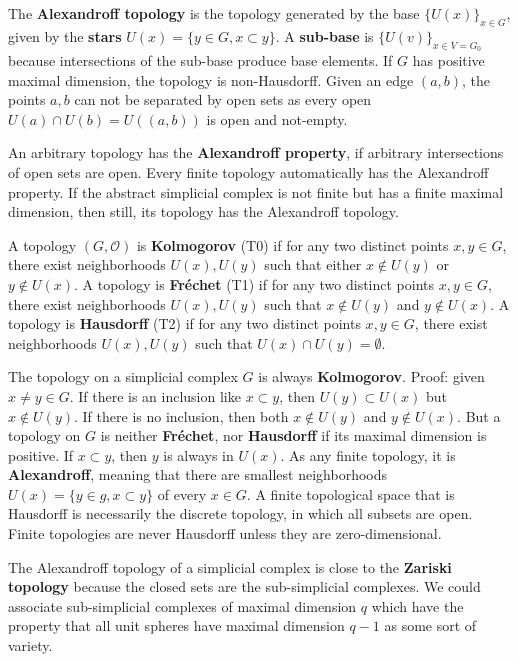 \documentclass[12pt]{amsart}
\begin{document}
\vspace{3mm}
The {\bf Alexandroff topology} is the topology generated
by the base $\{ U(x) \}_{x \in G}$, 
given by the {\bf stars} $U(x)=\{y \in G, x \subset y\}$. 
A {\bf sub-base} is $\{ U(v) \}_{x \in V=G_0}$ because intersections
of the sub-base produce base elements. If $G$ has positive maximal 
dimension, the topology is non-Hausdorff. Given an edge $(a,b)$, 
the points $a,b$ can not be separated by open sets as every open 
$U(a) \cap U(b)= U( (a,b) )$ is open and not-empty. 

\vspace{3mm}
An arbitrary topology has the {\bf Alexandroff property}, if arbitrary 
intersections of open sets are open. Every finite
topology automatically has the Alexandroff property.
If the abstract simplicial complex is not finite 
but has a finite maximal dimension, then still, 
its topology has the Alexandroff topology. 

\vspace{3mm}
A topology $(G,\mathcal{O})$ is {\bf Kolmogorov} (T0) if for any two distinct points $x,y \in G$,
there exist neighborhoods $U(x),U(y)$ such that either $x \notin U(y)$ or 
$y \notin U(x)$. A topology is {\bf Fr\'echet} (T1) if for any two distinct points $x,y \in G$,
there exist neighborhoods $U(x),U(y)$ such that $x \notin U(y)$ and $y \notin U(x)$. 
A topology is {\bf Hausdorff} (T2) if for any two distinct points $x,y \in G$, 
there exist neighborhoods $U(x),U(y)$ such that $U(x) \cap U(y) = \emptyset$. 

\vspace{3mm}
The topology on a simplicial complex $G$ is always {\bf Kolmogorov}. Proof:
given $x \neq y \in G$. If there is an inclusion like $x \subset y$, then $U(y) \subset U(x)$ but $x \notin U(y)$. 
If there is no inclusion, then both $x \notin U(y)$ and $y \notin U(x)$. 
But a topology on $G$ is neither {\bf Fr\'echet}, nor {\bf Hausdorff} if its maximal
dimension is positive. If $x \subset y$, then $y$ is always in $U(x)$. 
As any finite topology, it is {\bf Alexandroff}, meaning that there are smallest
neighborhoods $U(x) = \{ y \in g, x \subset y\}$ of every $x \in G$. 
A finite topological space that is 
Hausdorff is necessarily the discrete topology, in which all subsets are open.
Finite topologies are never Hausdorff unless they are zero-dimensional. 

\vspace{3mm}
The Alexandroff topology of a simplicial complex is close to the {\bf Zariski topology} 
because the closed sets are the sub-simplicial complexes. We could 
associate sub-simplicial complexes of maximal dimension $q$ which have the property 
that all unit spheres have maximal dimension $q-1$ as some sort of variety.
\end{document}
